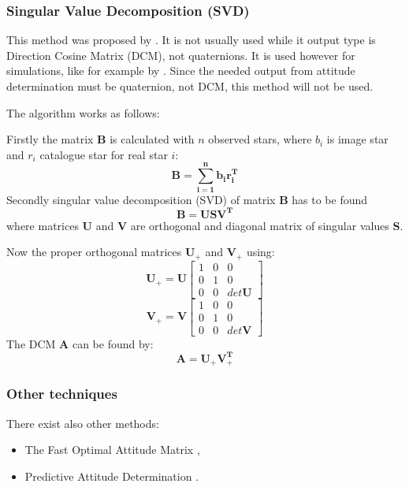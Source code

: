 \documentclass[12pt,a4paper,oneside]{article}
\begin{document}
\subsubsection{Singular Value Decomposition (SVD)}

This method was proposed by \citet{markley1988attitude}. It is not usually used while it output type is Direction Cosine Matrix (DCM), not quaternions. It is used however for simulations, like for example by \citet{mcbryde2012star}.
Since the needed output from attitude determination must be quaternion, not DCM, this method will not be used.
 
The algorithm works as follows:

Firstly 	the matrix $\bm{B}$ is calculated with $n$ observed stars, where $b_i$ is image star and $r_i$ catalogue star for real star $i$:
\begin{equation}
\bm{B = \sum_{i=1}^nb_ir_i^T}
\end{equation}
Secondly singular value decomposition (SVD) of matrix $\bm{B}$ has to be found
\begin{equation}
\bm{B = USV^T}
\end{equation}
where matrices $\bm{U}$ and $\bm{V}$ are orthogonal and diagonal matrix of singular values $\bm{S}$.

Now the proper orthogonal matrices $\bm{U}_+$ and $\bm{V}_+$ using:
\begin{equation}
\bm{U}_+ = \bm{U}\begin{bmatrix}
1 & 0 & 0 \\
0 & 1 & 0 \\
0 & 0 & det\bm{U}
\end{bmatrix}
\end{equation}
\begin{equation}
\bm{V}_+ = \bm{V}\begin{bmatrix}
1 & 0 & 0 \\
0 & 1 & 0 \\
0 & 0 & det\bm{V}
\end{bmatrix}
\end{equation}
The DCM $\bm{A}$ can be found by:
\begin{equation}
\bm{A = U_+V_+^T}
\end{equation}

\subsubsection{Other techniques}
There exist also other methods:
\begin{itemize}
\item The Fast Optimal Attitude Matrix \cite{markley1993attitude},
\item Predictive Attitude Determination \citet{crassidis1997predictive}.
\end{itemize}
\end{document}
